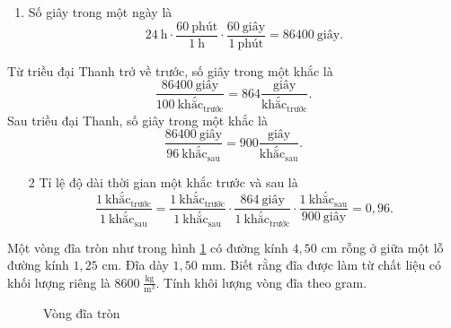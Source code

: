 \documentclass[a4paper, titlepage, openany]{book}
\newcounter{exercise}
\newcounter{solution}
\numberwithin{equation}{chapter}
\begin{document}
\solution
\begin{enumerate}
   \item Số giây trong một ngày là $$24\ \text{h} \cdot \frac{60\ \text{phút}}{1\ \text{h}} \cdot \frac{60\ \text{giây}}{1\ \text{phút}} = 86400\ \text{giây}.$$
\end{enumerate}
Từ triều đại Thanh trở về trước, số giây trong một khắc là $$\frac{86400\ \text{giây}}{100\ \text{khắc}_{\text{trước}}} = \boxed{864 \frac{\text{giây}}{\text{khắc}_{\text{trước}}}}.$$
Sau triều đại Thanh, số giây trong một khắc là $$\frac{86400\ \text{giây}}{96\ \text{khắc}_{\text{sau}}} = \boxed{900 \frac{\text{giây}}{\text{khắc}_{\text{sau}}}}.$$
\begin{enumerate}
   \item[2] Tỉ lệ độ dài thời gian một khắc trước và sau là $$\frac{1\ \text{khắc}_{\text{trước}}}{1\ \text{khắc}_{\text{sau}}} = \frac{1\ \text{khắc}_{\text{trước}}}{1\ \text{khắc}_{\text{sau}}}\cdot \frac{864\ \text{giây}}{1\ \text{khắc}_{\text{trước}}}\cdot\frac{1\ \text{khắc}_{\text{sau}}}{900\ \text{giây}}=\boxed{0{,}96}.$$
\end{enumerate}

\exercise Một vòng đĩa tròn như trong hình \ref{fig:vong_dia} có đường kính $4{,}50$ cm rỗng ở giữa một lỗ đường kính $1{,}25$ cm. Đĩa dày $1{,}50$ mm. Biết rằng đĩa được làm từ chất liệu có khối lượng riêng là $8600\;\frac{\text{kg}}{\text{m}^3}$. Tính khôi lượng vòng đĩa theo gram.

\begin{figure}
   \centering
   \caption{Vòng đĩa tròn}
   \label{fig:vong_dia}
\end{figure}
\end{document}
